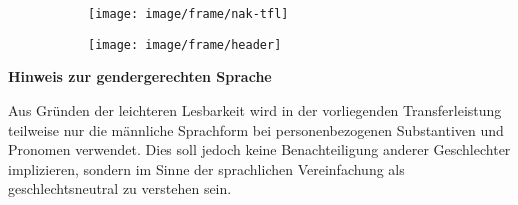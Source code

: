 \pagebreak
\thispagestyle{empty}

\setlength{\parindent}{0pt}

\begin{figure}[t]
	\vspace*{-2.9\baselineskip}
	\begin{subfigure}[b]{0.6\textwidth}
		\texttt{[image: image/frame/nak-tfl]}
	\end{subfigure}
	\begin{subfigure}[b]{0.4\textwidth}
		\texttt{[image: image/frame/header]}
	\end{subfigure}
\end{figure}
\begin{figure}[t]
\end{figure}


\vspace*{\fill}

\large
\textcolor{blue!30!black}{\textbf{Hinweis zur gendergerechten Sprache}}
\newline

\normalsize
Aus Gründen der leichteren Lesbarkeit wird in der vorliegenden Transferleistung teilweise nur die männliche Sprachform bei personenbezogenen Substantiven und Pronomen verwendet. Dies soll jedoch keine Benachteiligung anderer Geschlechter implizieren, sondern im Sinne der sprachlichen Vereinfachung als geschlechtsneutral zu verstehen sein. 

\vspace*{\fill}
